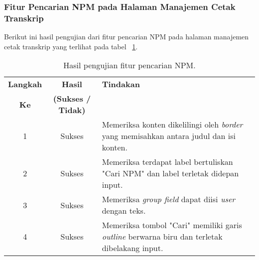 \subsubsection{Fitur Pencarian NPM pada Halaman Manajemen Cetak Transkrip}
Berikut ini hasil pengujian dari fitur pencarian NPM pada halaman manajemen cetak transkrip yang terlihat pada tabel ~\ref{hasil:PencarianNPMCetakTranskrip}.
\begin{table}[H]
	\centering 
	\caption{Hasil pengujian fitur pencarian NPM.}
	\label{hasil:PencarianNPMCetakTranskrip}
	\begin{tabular}{|c| c| p{}|}
		\toprule
		\textbf{Langkah} & \textbf{Hasil} & \textbf{Tindakan}\\
		\textbf{Ke} & \textbf{(Sukses / Tidak)} &\\
		\midrule
		1&Sukses&Memeriksa konten dikelilingi oleh \textit{border} yang memisahkan antara judul dan isi konten.\\
		\hline
		2&Sukses&Memeriksa terdapat label bertuliskan "Cari NPM" dan label terletak didepan input. \\
		\hline
		3&Sukses&Memeriksa \textit{group field} dapat diisi \textit{user} dengan teks.\\
		\hline
		4&Sukses&Memeriksa tombol "Cari" memiliki garis \textit{outline} berwarna biru dan terletak dibelakang input.\\		
		\bottomrule		
	\end{tabular} 
\end{table}


